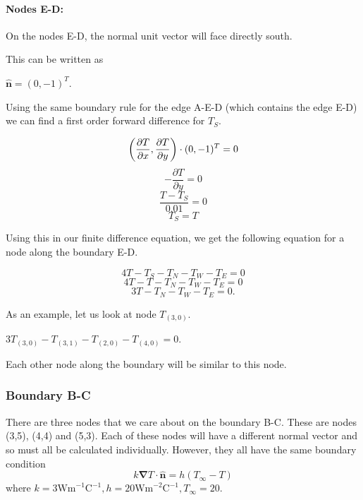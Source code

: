 \documentclass[12pt,a4paper]{article}
\begin{document}
\paragraph*{Nodes E-D:} On the nodes E-D, the normal unit vector will face directly south. 
\begin{center}
\end{center}
This can be written as 
\begin{center}
  $\hat{\textbf{n}}=(0,-1)^T$.
\end{center}
Using the same boundary rule for the edge A-E-D (which contains the edge E-D) we can find a first order forward difference for $T_S$.
\begin{center}
\[\bigg{(}\frac{\partial T}{\partial x},\frac{\partial T}{\partial y}\bigg{)}\cdot (0,-1)^T = 0\]
\[-\frac{\partial T}{\partial y}=0\]
\[\frac{T-T_S}{0.01}=0\]
\[T_S=T\]
\end{center} 
Using this in our finite difference equation, we get the following equation for a node along the boundary E-D.
\begin{center}
  \[4T-T_S-T_N-T_W-T_E=0\]
  \[4T-T-T_N-T_W-T_E=0\]
  \[3T-T_N-T_W-T_E=0.\]
\end{center}
As an example, let us look at node $T_{(3,0)}$.
\begin{center}
  $3T_{(3,0)}-T_{(3,1)}-T_{(2,0)}-T_{(4,0)}=0$.
\end{center}
Each other node along the boundary will be similar to this node.
\subsubsection*{Boundary B-C}
There are three nodes that we care about on the boundary B-C. These are nodes (3,5), (4,4) and (5,3). Each of these nodes will have a different normal vector and so must all be calculated individually. However, they all have the same boundary condition 
\[k\boldsymbol{\nabla}T\cdot\hat{\textbf{n}} = h(T_{\infty} - T)\]
where $k=3\text{Wm}^{-1}\text{C}^{-1}, h=20\text{Wm}^{-2}\text{C}^{-1}, T_\infty=20$.
\end{document}
